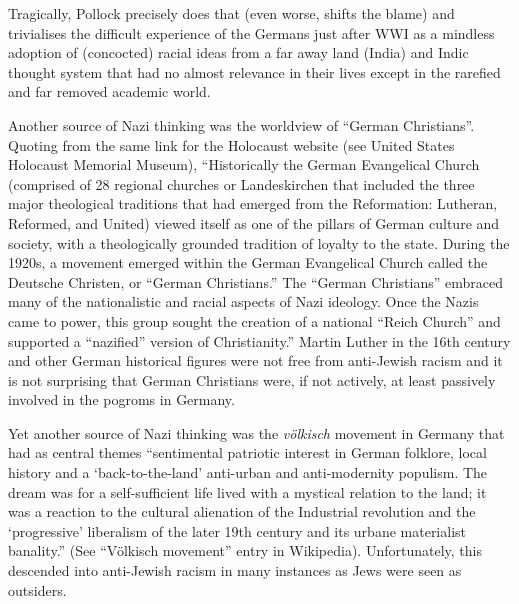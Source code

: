 Tragically, Pollock precisely does that (even worse, shifts the blame) and trivialises the difficult experience of the Germans just after WWI as a mindless adoption of (concocted) racial ideas from a far away land (India) and Indic thought system that had no almost relevance in their lives except in the rarefied and far removed academic world.

Another source of Nazi thinking was the worldview of “German Christians”. Quoting from the same link for the Holocaust website (see United States Holocaust Memorial Museum), “Historically the German Evangelical Church (comprised of 28 regional churches or Landeskirchen that included the three major theological traditions that had emerged from the Reformation: Lutheran, Reformed, and United) viewed itself as one of the pillars of German culture and society, with a theologically grounded tradition of loyalty to the state. During the 1920s, a movement emerged within the German Evangelical Church called the Deutsche Christen, or “German Christians.” The “German Christians” embraced many of the nationalistic and racial aspects of Nazi ideology. Once the Nazis came to power, this group sought the creation of a national “Reich Church” and supported a “nazified” version of Christianity.” Martin Luther in the 16th century and other German historical figures were not free from anti-Jewish racism and it is not surprising that German Christians were, if not actively, at least passively involved in the pogroms in Germany.

Yet another source of Nazi thinking was the {\sl völkisch} movement in Germany that had as central themes “sentimental patriotic interest in German folklore, local history and a ‘back-to-the-land’ anti-urban and anti-modernity populism. The dream was for a self-sufficient life lived with a mystical relation to the land; it was a reaction to the cultural alienation of the Industrial revolution and the ‘progressive’ liberalism of the later 19th century and its urbane materialist banality.” (See “Völkisch movement” entry in Wikipedia). Unfortunately, this descended into anti-Jewish racism in many instances as Jews were seen as outsiders.

